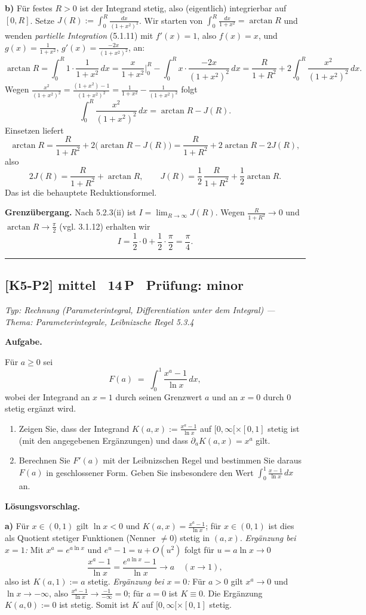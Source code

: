 \documentclass[a4paper,11pt]{article}
\begin{document}
\textbf{b)} Für festes $R>0$ ist der Integrand stetig, also (eigentlich) integrierbar auf $[0,R]$. Setze $J(R):=\int_0^R \frac{dx}{(1+x^2)^2}$. Wir starten von $\int_0^R \frac{dx}{1+x^2}=\arctan R$ und wenden \emph{partielle Integration} (5.1.11) mit $f'(x)=1$, also $f(x)=x$, und $g(x)=\frac{1}{1+x^2}$, $g'(x)=\frac{-2x}{(1+x^2)^2}$, an:
\[ \arctan R=\int_0^R 1\cdot\frac{1}{1+x^2}\,dx = \frac{x}{1+x^2}\Big|_0^R - \int_0^R x\cdot\frac{-2x}{(1+x^2)^2}\,dx = \frac{R}{1+R^2} + 2\int_0^R \frac{x^2}{(1+x^2)^2}\,dx. \]
Wegen $\frac{x^2}{(1+x^2)^2}=\frac{(1+x^2)-1}{(1+x^2)^2}=\frac{1}{1+x^2}-\frac{1}{(1+x^2)^2}$ folgt
\[ \int_0^R \frac{x^2}{(1+x^2)^2}\,dx = \arctan R - J(R). \]
Einsetzen liefert
\[ \arctan R = \frac{R}{1+R^2} + 2\bigl(\arctan R - J(R)\bigr) = \frac{R}{1+R^2} + 2\arctan R - 2J(R), \]
also
\[ 2J(R) = \frac{R}{1+R^2} + \arctan R,\qquad J(R)=\frac{1}{2}\,\frac{R}{1+R^2}+\frac{1}{2}\arctan R. \]
Das ist die behauptete Reduktionsformel.

\textbf{Grenzübergang.} Nach 5.2.3(ii) ist $I=\lim_{R\to\infty} J(R)$. Wegen $\frac{R}{1+R^2}\to 0$ und $\arctan R\to \frac{\pi}{2}$ (vgl. 3.1.12) erhalten wir
\[ I = \frac{1}{2}\cdot 0 + \frac{1}{2}\cdot\frac{\pi}{2} = \boxed{\dfrac{\pi}{4}}. \]\par\bigskip\hrule\bigskip
\subsection*{[K5-P2] \normalfont mittel \textbullet\ 14\,P \textbullet\ Pr\"ufung: minor}
\textit{Typ: Rechnung (Parameterintegral, Differentiation unter dem Integral)  ---  Thema: Parameterintegrale, Leibnizsche Regel 5.3.4}\par\smallskip
\textbf{Aufgabe.}\par
Für $a\ge 0$ sei
\[ F(a) \;=\; \int_{0}^{1} \frac{x^{a}-1}{\ln x}\,dx, \]
wobei der Integrand an $x=1$ durch seinen Grenzwert $a$ und an $x=0$ durch $0$ stetig ergänzt wird.
\begin{enumerate}[label=\alph*)]
  \item Zeigen Sie, dass der Integrand $K(a,x):=\frac{x^a-1}{\ln x}$ auf $[0,\infty[\times[0,1]$ stetig ist (mit den angegebenen Ergänzungen) und dass $\partial_a K(a,x)=x^a$ gilt.
  \item Berechnen Sie $F'(a)$ mit der Leibnizschen Regel und bestimmen Sie daraus $F(a)$ in geschlossener Form. Geben Sie insbesondere den Wert $\int_0^1 \frac{x-1}{\ln x}\,dx$ an.
\end{enumerate}\par\smallskip
\textbf{L\"osungsvorschlag.}\par
\textbf{a)} Für $x\in(0,1)$ gilt $\ln x<0$ und $K(a,x)=\frac{x^a-1}{\ln x}$; für $x\in(0,1)$ ist dies als Quotient stetiger Funktionen (Nenner $\neq 0$) stetig in $(a,x)$.
\emph{Ergänzung bei $x=1$:} Mit $x^a=e^{a\ln x}$ und $e^{u}-1=u+O(u^2)$ folgt für $u=a\ln x\to 0$
\[ \frac{x^a-1}{\ln x}=\frac{e^{a\ln x}-1}{\ln x}\longrightarrow a \quad (x\to 1), \]
also ist $K(a,1):=a$ stetig.
\emph{Ergänzung bei $x=0$:} Für $a>0$ gilt $x^a\to 0$ und $\ln x\to-\infty$, also $\frac{x^a-1}{\ln x}\to \frac{-1}{-\infty}=0$; für $a=0$ ist $K\equiv 0$. Die Ergänzung $K(a,0):=0$ ist stetig. Somit ist $K$ auf $[0,\infty[\times[0,1]$ stetig.
\end{document}
